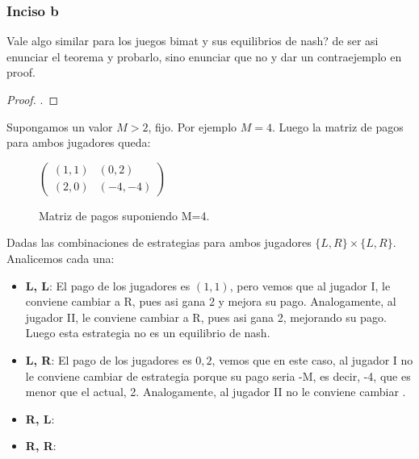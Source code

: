 \subsubsection{Inciso b}

\begin{theorem}
	Vale algo similar para los juegos bimat y sus equilibrios de nash? de ser asi enunciar el teorema y probarlo, sino enunciar que no y dar un contraejemplo en proof.
\end{theorem}
\begin{proof}
	.
\end{proof}

Supongamos un valor $ M > 2$, fijo. Por ejemplo $M = 4$. Luego la matriz de pagos para ambos jugadores queda:

\vspace{0.5cm}
\begin{figure}[H]
  \centering	
$\begin{pmatrix}
	(1,1) & (0, 2) \\
	(2, 0) & (-4, -4)
\end{pmatrix} $
  \caption{Matriz de pagos suponiendo M=4.}
\end{figure}


\vspace{0.5cm}
Dadas las combinaciones de estrategias para ambos jugadores $\{L, R\} \times \{L, R\}$. Analicemos cada una:
\begin{itemize}
	\item \textbf{L, L}: El pago de los jugadores es $(1,1)$, pero vemos que al jugador I, le conviene cambiar a R, pues asi gana 2 y mejora su pago. Analogamente, al jugador II, le conviene cambiar a R, pues asi gana 2, mejorando su pago. Luego esta estrategia no es un equilibrio de nash.   
	\item \textbf{L, R}: El pago de los jugadores es $0, 2$, vemos que en este caso, al jugador I no le conviene cambiar de estrategia porque su pago seria -M, es decir, -4, que es menor que el actual, 2. Analogamente, al jugador II no le conviene cambiar .
	\item \textbf{R, L}: 
	\item \textbf{R, R}: 

\end{itemize}